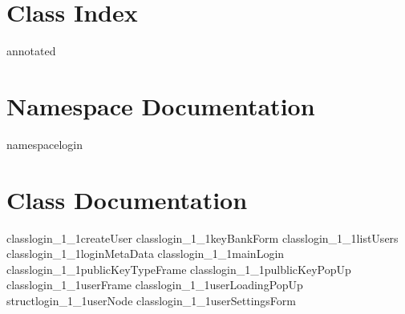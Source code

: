 

	\chapter{Class Index}
		{annotated}
	\chapter{Namespace Documentation}
		{namespacelogin}
		
	\chapter{Class Documentation}
	
		{classlogin_1_1createUser}
		{classlogin_1_1keyBankForm}
		{classlogin_1_1listUsers}
		{classlogin_1_1loginMetaData}
		{classlogin_1_1mainLogin}
		{classlogin_1_1publicKeyTypeFrame}
		{classlogin_1_1pulblicKeyPopUp}
		{classlogin_1_1userFrame}
		{classlogin_1_1userLoadingPopUp}
		{structlogin_1_1userNode}
		{classlogin_1_1userSettingsForm}